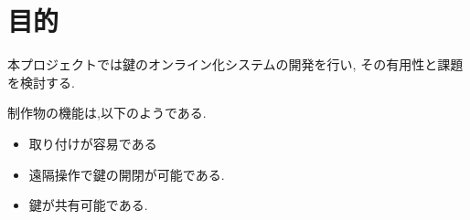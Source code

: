 \section{目的}
本プロジェクトでは鍵のオンライン化システムの開発を行い,
その有用性と課題を検討する.

制作物の機能は,以下のようである.

\begin{itemize}[noitemsep]
  \item 取り付けが容易である
  \item 遠隔操作で鍵の開閉が可能である.
  \item 鍵が共有可能である.
\end{itemize}

